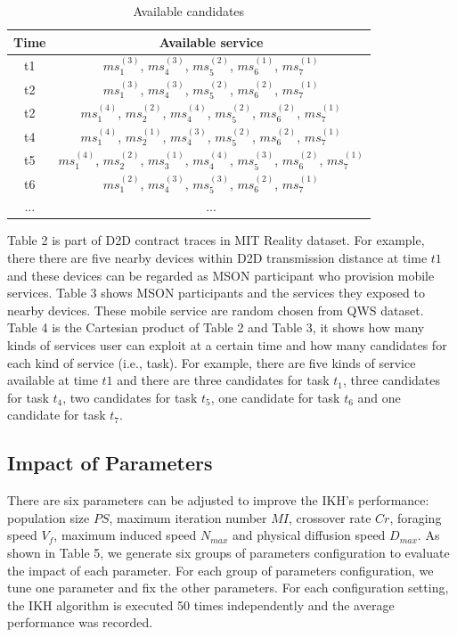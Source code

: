 \documentclass[10pt,journal,compsoc]{IEEEtran}
\begin{document}
\begin{table}[!t]
\renewcommand{\arraystretch}{1.8}
\caption{Available candidates}
\label{Available candidates}
\centering
\begin{tabular}{c c}
\hline
\bfseries Time & \bfseries Available service\\
\hline
t1     & $ms_1^{(3)}$, $ms_4^{(3)}$, $ms_5^{(2)}$, $ms_6^{(1)}$, $ms_7^{(1)}$ \\
t2     & $ms_1^{(3)}$, $ms_4^{(3)}$, $ms_5^{(2)}$, $ms_6^{(2)}$, $ms_7^{(1)}$ \\
t2     & $ms_1^{(4)}$, $ms_2^{(2)}$, $ms_4^{(4)}$, $ms_5^{(2)}$, $ms_6^{(2)}$, $ms_7^{(1)}$ \\
t4     & $ms_1^{(4)}$, $ms_2^{(1)}$, $ms_4^{(3)}$, $ms_5^{(2)}$, $ms_6^{(2)}$, $ms_7^{(1)}$ \\
t5     & $ms_1^{(4)}$, $ms_2^{(2)}$, $ms_3^{(1)}$, $ms_4^{(4)}$, $ms_5^{(3)}$, $ms_6^{(2)}$, $ms_7^{(1)}$ \\
t6     & $ms_1^{(2)}$, $ms_4^{(3)}$, $ms_5^{(3)}$, $ms_6^{(2)}$, $ms_7^{(1)}$ \\
... & ...\\
\hline
\end{tabular}
\end{table}

Table 2 is part of D2D contract traces in MIT Reality dataset. For example, there there are five nearby devices within D2D transmission distance at time $t1$ and these devices can be regarded as MSON participant who provision mobile services. Table 3 shows MSON participants and the services they exposed to nearby devices. These mobile service are random chosen from QWS dataset. Table 4 is the Cartesian product of Table 2 and Table 3, it shows how many kinds of services user can exploit at a certain time and how many candidates for each kind of service (i.e., task). For example, there are five kinds of service available at time $t1$ and there are three candidates for task $t_1$, three candidates for task $t_4$, two candidates for task $t_5$, one candidate for task $t_6$ and one candidate for task $t_7$.

\subsection{Impact of Parameters}
There are six parameters can be adjusted to improve the IKH's performance: population size $PS$, maximum iteration number $MI$, crossover rate $Cr$, foraging speed $V_f$, maximum induced speed $N_{max}$ and physical diffusion speed $D_{max}$. As shown in Table 5, we generate six groups of parameters configuration to evaluate the impact of each parameter. For each group of parameters configuration, we tune one parameter and fix the other parameters. For each configuration setting, the IKH algorithm is executed 50 times independently and the average performance was recorded.
\end{document}

